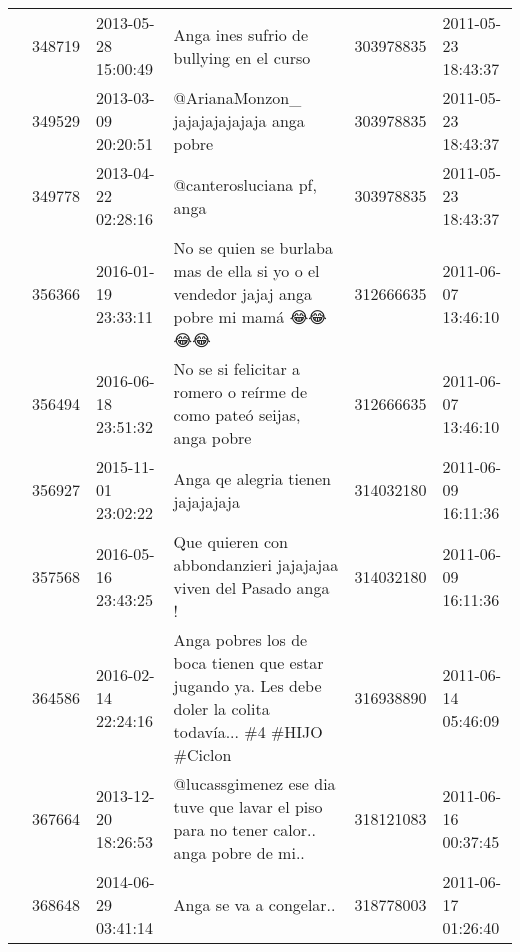 \begin{tabular}{llllrl}
           & 348719  & 2013-05-28 15:00:49 &                                                                                                     Anga ines sufrio de bullying en el curso &   303978835 & 2011-05-23 18:43:37 \\
           & 349529  & 2013-03-09 20:20:51 &                                                                                                     @ArianaMonzon\_ jajajajajajaja anga pobre &   303978835 & 2011-05-23 18:43:37 \\
           & 349778  & 2013-04-22 02:28:16 &                                                                                                                    @canterosluciana pf, anga &   303978835 & 2011-05-23 18:43:37 \\
           & 356366  & 2016-01-19 23:33:11 &                                                         No se quien se burlaba mas de ella si yo o el vendedor jajaj anga pobre mi mamá 😂😂😂😂 &   312666635 & 2011-06-07 13:46:10 \\
           & 356494  & 2016-06-18 23:51:32 &                                                                        No se si felicitar a romero o reírme de como pateó seijas, anga pobre &   312666635 & 2011-06-07 13:46:10 \\
           & 356927  & 2015-11-01 23:02:22 &                                                                                                            Anga qe alegria tienen jajajajaja &   314032180 & 2011-06-09 16:11:36 \\
           & 357568  & 2016-05-16 23:43:25 &                                                                              Que quieren con abbondanzieri jajajajaa viven del Pasado anga ! &   314032180 & 2011-06-09 16:11:36 \\
           & 364586  & 2016-02-14 22:24:16 &                                    Anga pobres los de boca tienen que estar jugando ya. Les debe doler la colita todavía... \#4 \#HIJO \#Ciclon &   316938890 & 2011-06-14 05:46:09 \\
           & 367664  & 2013-12-20 18:26:53 &                                                       @lucassgimenez ese dia tuve que lavar el piso para no tener calor.. anga pobre de mi.. &   318121083 & 2011-06-16 00:37:45 \\
           & 368648  & 2014-06-29 03:41:14 &                                                                                                                      Anga se va a congelar.. &   318778003 & 2011-06-17 01:26:40 \\

\end{tabular}
